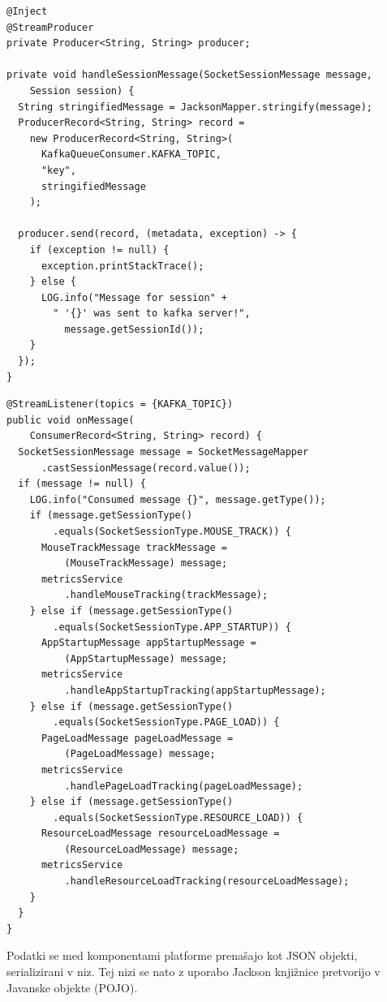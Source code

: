 \documentclass[a4paper, 12pt]{book}
\begin{document}
\begin{lstlisting}[label=code:service_kafka_producer, caption=Objavljanje sporočila v Kafko]
@Inject
@StreamProducer
private Producer<String, String> producer;

private void handleSessionMessage(SocketSessionMessage message,
    Session session) {
  String stringifiedMessage = JacksonMapper.stringify(message);
  ProducerRecord<String, String> record = 
    new ProducerRecord<String, String>(
      KafkaQueueConsumer.KAFKA_TOPIC,
      "key",
      stringifiedMessage
    );

  producer.send(record, (metadata, exception) -> {
    if (exception != null) {
      exception.printStackTrace();
    } else {
      LOG.info("Message for session" +
        " '{}' was sent to kafka server!",
          message.getSessionId());
    }
  });
}
\end{lstlisting}

\begin{lstlisting}[label=code:service_kafka_consumer, caption=Naročanje na sporočila v Kafki]
@StreamListener(topics = {KAFKA_TOPIC})
public void onMessage(
    ConsumerRecord<String, String> record) {
  SocketSessionMessage message = SocketMessageMapper
      .castSessionMessage(record.value());
  if (message != null) {
    LOG.info("Consumed message {}", message.getType());
    if (message.getSessionType()
        .equals(SocketSessionType.MOUSE_TRACK)) {
      MouseTrackMessage trackMessage = 
          (MouseTrackMessage) message;
      metricsService
          .handleMouseTracking(trackMessage);
    } else if (message.getSessionType()
        .equals(SocketSessionType.APP_STARTUP)) {
      AppStartupMessage appStartupMessage =
          (AppStartupMessage) message;
      metricsService
          .handleAppStartupTracking(appStartupMessage);
    } else if (message.getSessionType()
        .equals(SocketSessionType.PAGE_LOAD)) {
      PageLoadMessage pageLoadMessage =
          (PageLoadMessage) message;
      metricsService
          .handlePageLoadTracking(pageLoadMessage);
    } else if (message.getSessionType()
        .equals(SocketSessionType.RESOURCE_LOAD)) {
      ResourceLoadMessage resourceLoadMessage =
          (ResourceLoadMessage) message;
      metricsService
          .handleResourceLoadTracking(resourceLoadMessage);
    }
  }
}
\end{lstlisting}

Podatki se med komponentami platforme prenašajo kot JSON objekti, serializirani v niz. Tej nizi se nato z uporabo Jackson knjižnice pretvorijo v Javanske objekte (POJO).
\end{document}
